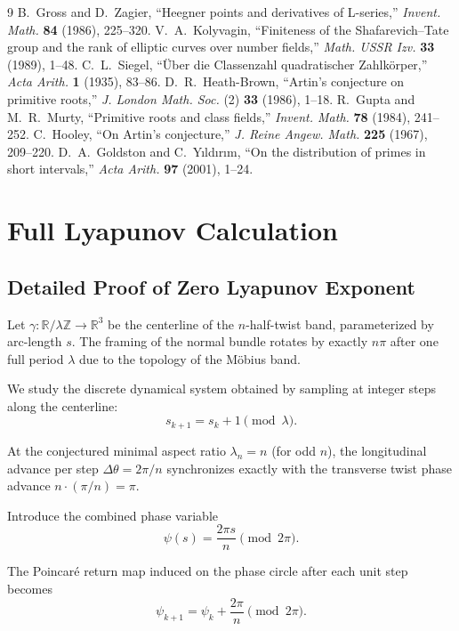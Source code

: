 \documentclass[11pt,a4paper]{article}
\begin{document}
\begin{thebibliography}{9}
 B.~Gross and D.~Zagier, ``Heegner points and derivatives of L-series,'' \emph{Invent. Math.} \textbf{84} (1986), 225--320.
 V.~A.~Kolyvagin, ``Finiteness of the Shafarevich--Tate group and the rank of elliptic curves over number fields,'' \emph{Math. USSR Izv.} \textbf{33} (1989), 1--48.
 C.~L.~Siegel, ``Über die Classenzahl quadratischer Zahlkörper,'' \emph{Acta Arith.} \textbf{1} (1935), 83--86.
 D.~R.~Heath-Brown, ``Artin's conjecture on primitive roots,'' \emph{J. London Math. Soc.} (2) \textbf{33} (1986), 1--18.
 R.~Gupta and M.~R.~Murty, ``Primitive roots and class fields,'' \emph{Invent. Math.} \textbf{78} (1984), 241--252.
 C.~Hooley, ``On Artin's conjecture,'' \emph{J. Reine Angew. Math.} \textbf{225} (1967), 209--220.
 D.~A.~Goldston and C.~Yıldırım, ``On the distribution of primes in short intervals,'' \emph{Acta Arith.} \textbf{97} (2001), 1--24.
\end{thebibliography}

\appendix
\section{Full Lyapunov Calculation}
\label{sec:full-lyapunov}

\subsection{Detailed Proof of Zero Lyapunov Exponent}

Let $\gamma: \mathbb{R}/\lambda\mathbb{Z} \to \mathbb{R}^3$ be the centerline of the $n$-half-twist band, parameterized by arc-length $s$. The framing of the normal bundle rotates by exactly $n\pi$ after one full period $\lambda$ due to the topology of the M\"obius band.

We study the discrete dynamical system obtained by sampling at integer steps along the centerline:
\[
s_{k+1} = s_k + 1 \pmod{\lambda}.
\]

At the conjectured minimal aspect ratio $\lambda_n = n$ (for odd $n$), the longitudinal advance per step $\Delta\theta = 2\pi / n$ synchronizes exactly with the transverse twist phase advance $n \cdot (\pi / n) = \pi$.

Introduce the combined phase variable
\[
\psi(s) = \frac{2\pi s}{n} \pmod{2\pi}.
\]

The Poincaré return map induced on the phase circle after each unit step becomes
\[
\psi_{k+1} = \psi_k + \frac{2\pi}{n} \pmod{2\pi}.
\]
\end{document}
